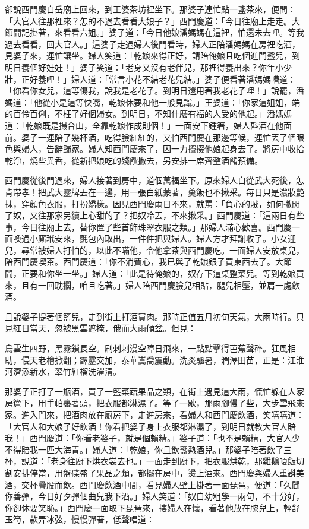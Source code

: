 \begin{showcontents}{}
卻說西門慶自岳廟上回來，到王婆茶坊裡坐下。那婆子連忙點一盞茶來，便問：「大官人往那裡來？怎的不過去看看大娘子？」西門慶道：「今日往廟上走走。大節間記掛著，來看看六姐。」婆子道：「今日他娘潘媽媽在這裡，怕還未去哩。等我過去看看，回大官人。」這婆子走過婦人後門看時，婦人正陪潘媽媽在房裡吃酒，見婆子來，連忙讓坐。婦人笑道：「乾娘來得正好，請陪俺娘且吃個進門盞兒，到明日養個好娃娃！」婆子笑道：「老身又沒有老伴兒，那裡得養出來？你年小少壯，正好養哩！」婦人道：「常言小花不結老花兒結。」婆子便看著潘媽媽嘈道：「你看你女兒，這等傷我，說我是老花子。到明日還用著我老花子哩！」說罷，潘媽道：「他從小是這等快嘴，乾娘休要和他一般見識。」王婆道：「你家這姐姐，端的百伶百俐，不枉了好個婦女。到明日，不知什麼有福的人受的他起。」潘媽媽道：「乾娘既是撮合山，全靠乾娘作成則個！」一面安下鍾箸，婦人斟酒在他面前。婆子一連陪了幾杯酒，吃得臉紅紅的，又怕西門慶在那邊等候，連忙丟了個眼色與婦人，告辭歸家。婦人知西門慶來了，因一力攛掇他娘起身去了。將房中收拾乾淨，燒些異香，從新把娘吃的殘饌撇去，另安排一席齊整酒餚預備。

西門慶從後門過來，婦人接著到房中，道個萬福坐下。原來婦人自從武大死後，怎肯帶孝！把武大靈牌丟在一邊，用一張白紙蒙著，羹飯也不揪采。每日只是濃妝艷抹，穿顏色衣服，打扮嬌樣。因見西門慶兩日不來，就罵：「負心的賊，如何撇閃了奴，又往那家另續上心甜的了？把奴冷丟，不來揪采。」西門慶道：「這兩日有些事，今日往廟上去，替你置了些首飾珠翠衣服之類。」那婦人滿心歡喜。西門慶一面喚過小廝玳安來，氈包內取出，一件件把與婦人。婦人方才拜謝收了。小女迎兒，尋常被婦人打怕的，以此不瞞他，令他拿茶與西門慶吃。一面婦人安放桌兒，陪西門慶喫茶。西門慶道：「你不消費心，我已與了乾娘銀子買東西去了。大節間，正要和你坐一坐。」婦人道：「此是待俺娘的，奴存下這桌整菜兒。等到乾娘買來，且有一回耽擱，咱且吃著。」婦人陪西門慶臉兒相貼，腿兒相壓，並肩一處飲酒。

且說婆子提著個籃兒，走到街上打酒買肉。那時正值五月初旬天氣，大雨時行。只見紅日當天，忽被黑雲遮掩，俄而大雨傾盆。但見：

烏雲生四野，黑霧鎖長空。刷剌剌漫空障日飛來，一點點擊得芭蕉聲碎。狂風相助，侵天老檜掀翻；霹靂交加，泰華嵩喬震動。洗炎驅暑，潤澤田苗，正是：江淮河濟添新水，翠竹紅榴洗濯清。

那婆子正打了一瓶酒，買了一籃菜蔬果品之類，在街上遇見這大雨，慌忙躲在人家房簷下，用手帕裹著頭，把衣服都淋濕了。等了一歇，那雨腳慢了些，大步雲飛來家。進入門來，把酒肉放在廚房下，走進房來，看婦人和西門慶飲酒，笑嘻嘻道：「大官人和大娘子好飲酒！你看把婆子身上衣服都淋濕了，到明日就教大官人賠我！」西門慶道：「你看老婆子，就是個賴精。」婆子道：「也不是賴精，大官人少不得賠我一匹大海青。」婦人道：「乾娘，你且飲盞熱酒兒。」那婆子陪著飲了三杯，說道：「老身往廚下烘衣裳去也。」一面走到廚下，把衣服烘乾，那雞鵝嗄飯切割安排停當，用盤碟盛了果品之類，都擺在房中，燙上酒來。西門慶與婦人重斟美酒，交杯疊股而飲。西門慶飲酒中間，看見婦人壁上掛著一面琵琶，便道：「久聞你善彈，今日好夕彈個曲兒我下酒。」婦人笑道：「奴自幼粗學一兩句，不十分好，你卻休要笑恥。」西門慶一面取下琵琶來，摟婦人在懷，看著他放在膝兒上，輕舒玉筍，款弄冰弦，慢慢彈著，低聲唱道：


\end{showcontents}

